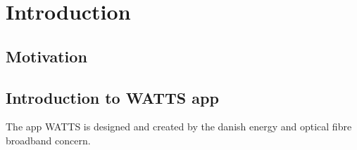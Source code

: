 \chapter{Introduction}

\section{Motivation}

\section{Introduction to WATTS app}
The app WATTS is designed and created by the danish energy and optical fibre broadband concern. 